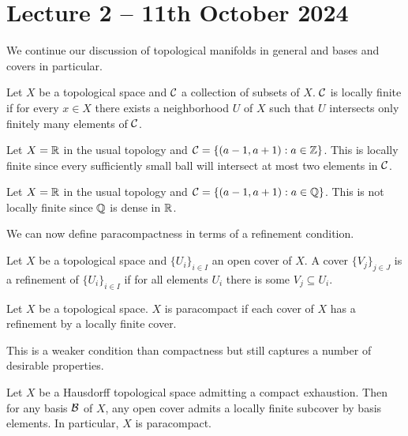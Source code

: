 \section{Lecture 2 -- 11th October 2024}
We continue our discussion of topological manifolds in general and bases and covers in particular. 
\begin{definition}\label{def: locally finite}
    Let $X$ be a topological space and $\mathcal{C}$ a collection of subsets of $X$. $\mathcal{C}$ is locally finite if for every $x\in X$ there exists a neighborhood $U$ of $X$ such that $U$ intersects only finitely many elements of $\mathcal{C}$. 
\end{definition}
\begin{example}
    Let $X=\mathbb{R}$ in the usual topology and $\mathcal{C}=\{(a-1, a+1): a\in\mathbb{Z}\}$. This is locally finite since every sufficiently small ball will intersect at most two elements in $\mathcal{C}$. 
\end{example}
\begin{example}
    Let $X=\mathbb{R}$ in the usual topology and $\mathcal{C}=\{(a-1,a+1):a\in\mathbb{Q}\}$. This is not locally finite since $\mathbb{Q}$ is dense in $\mathbb{R}$. 
\end{example}
We can now define paracompactness in terms of a refinement condition. 
\begin{definition}[Refinement]\label{def: refinement}
    Let $X$ be a topological space and $\{U_{i}\}_{i\in I}$ an open cover of $X$. A cover $\{V_{j}\}_{j\in J}$ is a refinement of $\{U_{i}\}_{i\in I}$ if for all elements $U_{i}$ there is some $V_{j}\subseteq U_{i}$.
\end{definition}
\begin{definition}[Paracompact]\label{def: paracompact}
    Let $X$ be a topological space. $X$ is paracompact if each cover of $X$ has a refinement by a locally finite cover. 
\end{definition}
This is a weaker condition than compactness but still captures a number of desirable properties. 
\begin{lemma}\label{lem: hausdorff and compact exhaustion is paracompact}
    Let $X$ be a Hausdorff topological space admitting a compact exhaustion. Then for any basis $\mathcal{B}$ of $X$, any open cover admits a locally finite subcover by basis elements. In particular, $X$ is paracompact. 
\end{lemma}
